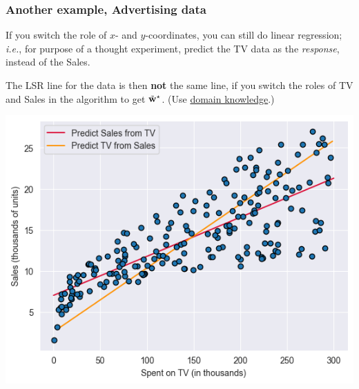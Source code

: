 \documentclass{beamer}
\theoremstyle{example}
\begin{document}
\begin{frame}[fragile]
\frametitle{Another example, Advertising data}
If you switch the role of $x$- and $y$-coordinates, you can still do linear regression; \textit{i.e.}, for purpose of a thought experiment, predict the TV data as the \emph{response}, instead of the Sales.

The LSR line for the data is then \textbf{not} the same line, if you switch the roles of TV and Sales in the algorithm to get $\tilde{\bf w}^\star$. (Use \underline{domain knowledge}.)

\centering
\includegraphics[height=0.4\textheight]{../../Images/advertising-plot2.png}
\vfill

\end{frame}
\end{document}
